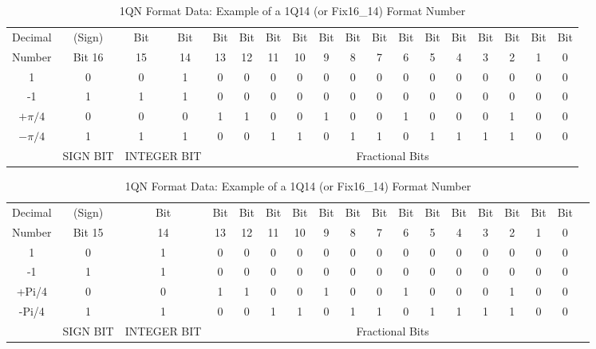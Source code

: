 \begin{landscape}
\begin{table}[!hbtp]
  \centering
  \caption{2QN Format Data: Example of a 2Q14 (or Fix17\_14) Format Number}
  \label{tab:2QNformat}%
  \centering
    \begin{tabular}{|c|c|c|c|c|c|c|c|c|c|c|c|c|c|c|c|c|c|}
    \toprule
    Decimal & (Sign)& Bit  & Bit & Bit  & Bit & Bit & Bit & Bit  & Bit & Bit  & Bit  & Bit  & Bit  & Bit  & Bit  & Bit  & Bit  \\
    Number & Bit 16 & 15 & 14 & 13 &   12 &   11 &   10 &   9 &   8 &   7 &   6 &   5 &   4 &   3 &   2 &   1 &   0 \\
    \midrule
    1     & 0     & 0     & 1     & 0     & 0     & 0     & 0     & 0     & 0     & 0     & 0     & 0     & 0     & 0     & 0     & 0     & 0 \\
    -1    & 1     & 1     & 1     & 0     & 0     & 0     & 0     & 0     & 0     & 0     & 0     & 0     & 0     & 0     & 0     & 0     & 0 \\
    $+\pi /4 $ & 0     & 0     & 0     & 1     & 1     & 0     & 0     & 1     & 0     & 0     & 1     & 0     & 0     & 0     & 1     & 0     & 0 \\
    $-\pi /4 $ & 1     & 1     & 1     & 0     & 0     & 1     & 1     & 0     & 1     & 1     & 0     & 1     & 1     & 1     & 1     & 0     & 0 \\
    \hline
         & SIGN BIT & \multicolumn{2}{|c|}{INTEGER BIT} & \multicolumn{14}{|c|}{Fractional Bits}  \\
    \bottomrule
    \end{tabular}%

  \caption{1QN Format Data: Example of a 1Q14 (or Fix16\_14) Format Number}
  \label{tab:1QNformat}%
    \begin{tabular}{|c|c|c|c|c|c|c|c|c|c|c|c|c|c|c|c|c|c|}
    \toprule
    Decimal & (Sign) & Bit  & Bit  & Bit & Bit  & Bit  & Bit  & Bit  & Bit  & Bit  & Bit  & Bit  & Bit  & Bit  & Bit  & Bit  \\
    Number & Bit 15   &   14 &   13 &   12 &   11 &   10 &   9 &   8 &   7 &   6 &   5 &   4 &   3 &   2 &   1 &   0 \\
    \midrule
    1     & 0     & 1     & 0     & 0     & 0     & 0     & 0     & 0     & 0     & 0     & 0     & 0     & 0     & 0     & 0     & 0 \\
    -1    & 1     & 1     & 0     & 0     & 0     & 0     & 0     & 0     & 0     & 0     & 0     & 0     & 0     & 0     & 0     & 0 \\
    +Pi/4 & 0     & 0     & 1     & 1     & 0     & 0     & 1     & 0     & 0     & 1     & 0     & 0     & 0     & 1     & 0     & 0 \\
    -Pi/4 & 1     & 1     & 0     & 0     & 1     & 1     & 0     & 1     & 1     & 0     & 1     & 1     & 1     & 1     & 0     & 0 \\
    \hline
          & SIGN BIT & INTEGER BIT & \multicolumn{14}{c}{Fractional Bits}     \\
    \bottomrule
    \end{tabular}%
     

\end{table}
\end{landscape}

